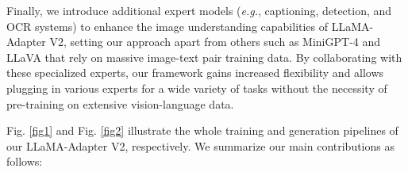 \documentclass[10pt,twocolumn,letterpaper]{article}
\begin{document}
Finally, we introduce additional expert models (\emph{e.g.}, captioning, detection, and OCR systems) to enhance the image understanding capabilities of LLaMA-Adapter V2, setting our approach apart from others such as MiniGPT-4 and LLaVA that rely on massive image-text pair training data. By collaborating with these specialized experts, our framework gains increased flexibility and allows plugging in various experts for a wide variety of tasks without the necessity of pre-training on extensive vision-language data.


\begin{table*}[t]
\centering
\small
{}
\caption{\textbf{Training Comparison of Different Methods.} CC, VG and L400 represent Conceptual Caption~\cite{sharma2018conceptual,changpinyo2021conceptual}, Visual Genome~\cite{krishna2017visual} and LAION 400M~\cite{schuhmann2021laion}, respectively. Note that we count all the data and tuning parameters needed to convert the pretrained vision model and LLM into a visual instruction model.  denotes the filtered dataset.}
\label{tab:param_compare_with_minigpt4_llava}
\end{table*} 
Fig. \ref{fig1} and Fig. \ref{fig2} illustrate the whole training and generation pipelines of our LLaMA-Adapter V2, respectively. We summarize our main contributions as follows:
\end{document}
